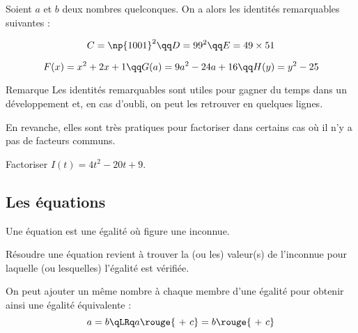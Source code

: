 \documentclass[xcolor={dvipsnames,svgnames,table}]{beamer}
\begin{document}
\begin{frame}
    \begin{Prop}
        Soient $a$ et $b$ deux nombres quelconques. On a alors les \alert{identités remarquables} suivantes :
        
        \rule{0pt}{5cm}
    \end{Prop}
\end{frame}

\begin{frame}%
    \begin{Proof}
        \rule{0pt}{7cm}
    \end{Proof}
\end{frame}

\begin{frame}
    \begin{Examples}
        \[C = \np{1001}^2 \qq D = 99^2 \qq E = 49 \times 51\]
        \rule{0pt}{6cm}
    \end{Examples}
\end{frame}

\begin{frame}
    \begin{Examples}
        \[F(x) = x^2 + 2x + 1 \qq G(a) = 9a^2 - 24a + 16 \qq H(y) = y^2 - 25\]
        \rule{0pt}{5.5cm}
    \end{Examples}
\end{frame}

\begin{frame}{Remarque}
    Les identités remarquables sont utiles pour gagner du temps dans un développement et, en cas d'oubli, on peut les retrouver en quelques lignes.\par
    En revanche, elles sont très pratiques pour factoriser dans certains cas où il n'y a pas de facteurs communs.
\end{frame}

\begin{frame}
    \begin{Example}
        Factoriser $I(t) = 4t^2 - 20t + 9$.\par
        \rule{0pt}{6cm}
    \end{Example}
\end{frame}

\subsection{Les équations}

\begin{frame}
    \begin{definition}
        Une \alert{équation} est une égalité où figure une inconnue.\par
        \alert{Résoudre} une équation revient à trouver la (ou les) valeur(s) de l'inconnue pour laquelle (ou lesquelles) l'égalité est vérifiée.
    \end{definition}
\pause
    \begin{Prop}
    On peut ajouter un même nombre à chaque membre d'une égalité pour obtenir ainsi une égalité équivalente :
        \[a = b \qLRq a \rouge{\ +\ c } = b \rouge{\ +\ c}\]
    \end{Prop}
\end{frame}
\end{document}
